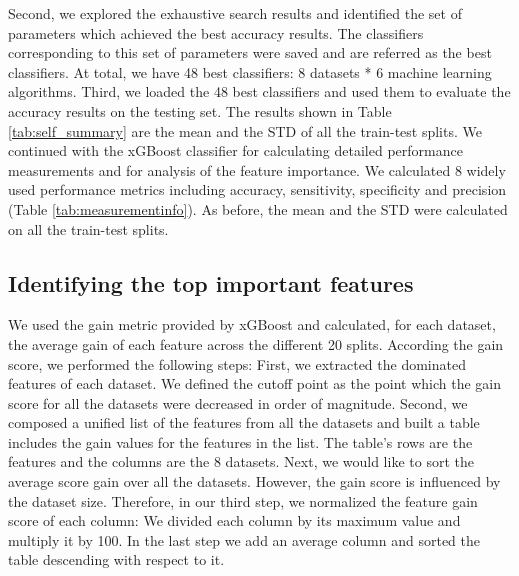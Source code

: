 \documentclass{bmcart}
\begin{document}
Second, we explored the exhaustive search results and identified the set of parameters which achieved the best accuracy results. The classifiers corresponding to this set of parameters were saved and are referred as the best classifiers. At total, we have 48 best classifiers: 8 datasets * 6 machine learning algorithms.
Third, we loaded the 48 best classifiers and used them to evaluate the accuracy results on the testing set. The results shown in Table \ref{tab:self_summary} are the mean and the STD of all the train-test splits.
We continued with the xGBoost classifier for calculating detailed performance measurements and for analysis of the feature importance. We calculated 8 widely used performance metrics including accuracy, sensitivity, specificity and precision (Table \ref{tab:measurementinfo}). As before, the mean and the STD were calculated on all the train-test splits.



\subsection*{Identifying the top important features}
We used the gain metric provided by xGBoost and calculated, for each dataset, the average gain of each feature across the different 20 splits. According the gain score, we performed the following steps: First, we extracted the dominated features of each dataset. We defined the cutoff point as the point which the gain score for all the datasets were decreased in order of magnitude.  
Second, we composed a unified list of the features from all the datasets and built a table includes the gain values for the features in the list. The table's rows are the features and the columns are the 8 datasets. Next, we would like to sort the average score gain over all the datasets. However, the gain score is influenced by the dataset size. Therefore, in our third step, we normalized the feature gain score of each column: We divided each column by its maximum value and multiply it by 100. In the last step we add an average column and sorted the table descending with respect to it.
\end{document}
